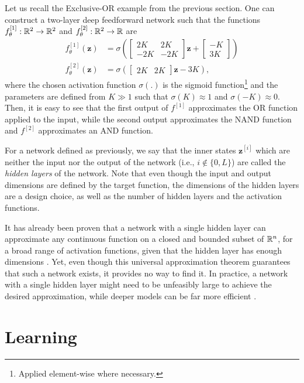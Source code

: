 Let us recall the Exclusive-OR example from the previous section. One can construct a two-layer deep feedforward network such that the functions $f_\theta^{[1]}:\mathbb{R}^2\to\mathbb{R}^2$ and $f_\theta^{[2]}:\mathbb{R}^2\to\mathbb{R}$ are
\begin{align*}
    f_\theta^{[1]}(\bm{z}) &= \sigma\left(
    \begin{bmatrix}
    2K & 2K \\
    -2K & -2K
    \end{bmatrix}\bm{z} + \begin{bmatrix}
    -K \\
    3K
    \end{bmatrix}\right) \\
    f_\theta^{[2]}(\bm{z}) &= \sigma\left(
    \begin{bmatrix}
    2K & 2K
    \end{bmatrix}\bm{z} - 3K\right)
,\end{align*}
where the chosen activation function $\sigma(.)$ is the sigmoid function\footnote{Applied element-wise where necessary.} and the parameters are defined from $K \gg 1$ such that $\sigma(K) \approx 1$ and $\sigma(-K) \approx 0$.
Then, it is easy to see that the first output of $f^{[1]}$ approximates the OR function applied to the input, while the second output approximates the NAND function and $f^{[2]}$ approximates an AND function.

For a network defined as previously, we say that the inner states $\bm{z}^{[i]}$ which are neither the input nor the output of the network (i.e., $i\not\in \{0,L\}$) are called the \textit{hidden layers} of the network.
Note that even though the input and output dimensions are defined by the target function, the dimensions of the hidden layers are a design choice, as well as the number of hidden layers and the activation functions.

It has already been proven that a network with a single hidden layer can approximate any continuous function on a closed and bounded subset of $\mathbb{R}^n$, for a broad range of activation functions, given that the hidden layer has enough dimensions \cite{hornik_multilayer_1989,leshno_multilayer_1993}.
Yet, even though this universal approximation theorem guarantees that such a network exists, it provides no way to find it.
In practice, a network with a single hidden layer might need to be unfeasibly large to achieve the desired approximation, while deeper models can be far more efficient \cite{goodfellow_deep_2016}.

\section{Learning}

